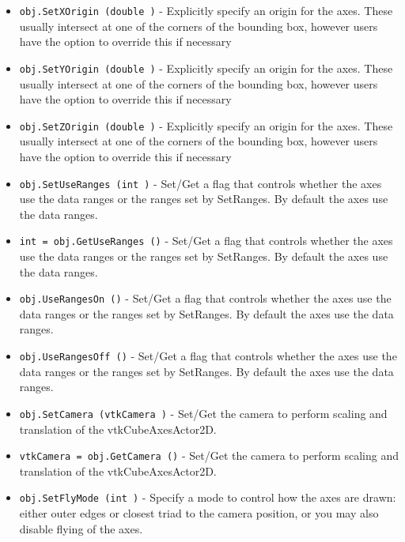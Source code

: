\begin{itemize}
\item  \verb|obj.SetXOrigin (double )| -  Explicitly specify an origin for the axes. These usually intersect at one of the
 corners of the bounding box, however users have the option to override this if
 necessary

\item  \verb|obj.SetYOrigin (double )| -  Explicitly specify an origin for the axes. These usually intersect at one of the
 corners of the bounding box, however users have the option to override this if
 necessary

\item  \verb|obj.SetZOrigin (double )| -  Explicitly specify an origin for the axes. These usually intersect at one of the
 corners of the bounding box, however users have the option to override this if
 necessary

\item  \verb|obj.SetUseRanges (int )| -  Set/Get a flag that controls whether the axes use the data ranges
 or the ranges set by SetRanges. By default the axes use the data
 ranges.

\item  \verb|int = obj.GetUseRanges ()| -  Set/Get a flag that controls whether the axes use the data ranges
 or the ranges set by SetRanges. By default the axes use the data
 ranges.

\item  \verb|obj.UseRangesOn ()| -  Set/Get a flag that controls whether the axes use the data ranges
 or the ranges set by SetRanges. By default the axes use the data
 ranges.

\item  \verb|obj.UseRangesOff ()| -  Set/Get a flag that controls whether the axes use the data ranges
 or the ranges set by SetRanges. By default the axes use the data
 ranges.

\item  \verb|obj.SetCamera (vtkCamera )| -  Set/Get the camera to perform scaling and translation of the 
 vtkCubeAxesActor2D.

\item  \verb|vtkCamera = obj.GetCamera ()| -  Set/Get the camera to perform scaling and translation of the 
 vtkCubeAxesActor2D.

\item  \verb|obj.SetFlyMode (int )| -  Specify a mode to control how the axes are drawn: either outer edges
 or closest triad to the camera position, or you may also disable flying 
 of the axes.


\end{itemize}
